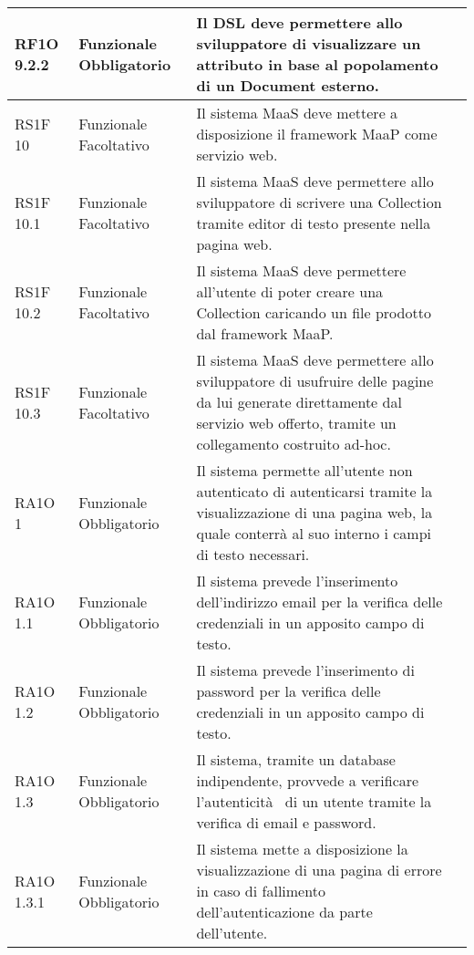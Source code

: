 \begin{center}
\begin{longtable}{ | p{2cm} | p{2cm} | p{5cm} | p{2cm} |}
        RF1O 9.2.2  & Funzionale \newline  Obbligatorio  & Il DSL deve permettere allo sviluppatore di visualizzare un attributo in base al popolamento di un Document esterno.
 &  \\ \hline      
        RS1F 10 & Funzionale \newline  Facoltativo  & Il sistema MaaS deve mettere a disposizione il framework MaaP come servizio web. &  \\ \hline      
        RS1F 10.1 & Funzionale \newline  Facoltativo  & Il sistema MaaS deve permettere allo sviluppatore di scrivere una Collection tramite editor di testo presente nella pagina web. &  \\ \hline      
        RS1F 10.2 & Funzionale \newline  Facoltativo  & Il sistema MaaS deve permettere all'utente di poter creare una Collection caricando un file prodotto dal framework MaaP. &  \\ \hline      
        RS1F 10.3 & Funzionale \newline  Facoltativo  & Il sistema MaaS deve permettere allo sviluppatore di usufruire delle pagine da lui generate direttamente dal servizio web offerto, tramite un collegamento costruito ad-hoc. &  \\ \hline      
        RA1O 1 & Funzionale \newline  Obbligatorio  & Il sistema permette all'utente non autenticato di autenticarsi tramite la visualizzazione di una pagina web, la quale conterrà al suo interno i campi di testo necessari. &  \\ \hline      
        RA1O 1.1 & Funzionale \newline  Obbligatorio  & Il sistema prevede l'inserimento dell'indirizzo email per la verifica delle credenziali in un apposito campo di testo. &  \\ \hline      
        RA1O 1.2 & Funzionale \newline  Obbligatorio  & Il sistema prevede l'inserimento di password per la verifica delle credenziali in un apposito campo di testo. &  \\ \hline      
        RA1O 1.3  & Funzionale \newline  Obbligatorio  & Il sistema, tramite un database indipendente, provvede a verificare l'autenticità  di un utente tramite la verifica di email e password. &  \\ \hline      
        RA1O 1.3.1 & Funzionale \newline  Obbligatorio  & Il sistema mette a disposizione la visualizzazione di una pagina di errore in caso di fallimento dell'autenticazione da parte dell'utente.

\end{longtable}
\end{center}
